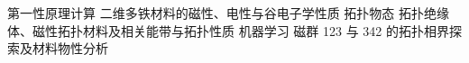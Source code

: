
\begin{cvskills}
  \cvskill
    {第一性原理计算}
    {二维多铁材料的磁性、电性与谷电子学性质}
  \cvskill
    {拓扑物态}
    {拓扑绝缘体、磁性拓扑材料及相关能带与拓扑性质}
  \cvskill
    {机器学习}
    {磁群 123 与 342 的拓扑相界探索及材料物性分析}
\end{cvskills}
